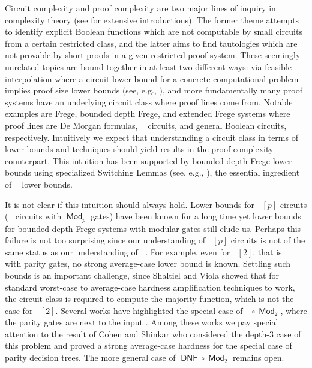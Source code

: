 \documentclass[a4paper,11pt,draft]{article}
\theoremstyle{definition}
\theoremstyle{remark}
\DeclareMathOperator{\ACzero}{\mathsf{AC}^0}
\DeclareMathOperator{\dnf}{\mathsf{DNF}}
\DeclareMathOperator{\Mod}{\mathsf{Mod}}
\DeclareMathOperator{\reslin}{\mathsf{Res}[\oplus]}
\begin{document}
Circuit complexity and proof complexity are two major lines of inquiry in complexity theory (see \cite{DBLP:books/daglib/0028687, kraj_2019} for extensive introductions). The former theme attempts to identify explicit Boolean functions which are not computable by small circuits from a certain restricted class, and the latter aims to find tautologies which are not provable by short proofs in a given restricted proof system. These seemingly unrelated topics are bound together in at least two different ways: via feasible interpolation where a circuit lower bound for a concrete computational problem implies proof size lower bounds (see, e.g., \cite{DBLP:conf/focs/HrubesP17}), and more fundamentally many proof systems have an underlying circuit class where proof lines come from. Notable examples are Frege, bounded depth Frege, and extended Frege systems where proof lines are De Morgan formulas, $\ACzero$ circuits, and general Boolean circuits, respectively. Intuitively we expect that understanding a circuit class in terms of lower bounds and techniques should yield results in the proof complexity counterpart. This intuition has been supported by bounded depth Frege lower bounds using specialized Switching Lemmas (see, e.g., \cite{DBLP:journals/jacm/Hastad21}), the essential ingredient of $\ACzero$ lower bounds.

\bigskip
\noindent{\bf $\ACzero[2]$ circuits and $\reslin$ proof system.} It is not clear if this intuition should always hold. Lower bounds for $\ACzero[p]$ circuits ($\ACzero$ circuits with $\Mod_p$ gates) have been known for a long time \cite{MR897705,DBLP:conf/stoc/Smolensky87} yet lower bounds for bounded depth Frege systems with modular gates still elude us. Perhaps this failure is not too surprising since our understanding of $\ACzero[p]$ circuits is not of the same status as our understanding of $\ACzero$. For example, even for $\ACzero[2]$, that is $\ACzero$ with parity gates, no strong average-case lower bound is known. Settling such bounds is an important challenge, since Shaltiel and Viola \cite{DBLP:journals/siamcomp/ShaltielV10} showed that for standard worst-case to average-case hardness amplification techniques to work, the circuit class is required to compute the majority function, which is not the case for $\ACzero[2]$. Several works have highlighted the special case of $\ACzero\circ \Mod_2$, where the parity gates are next to the input \cite{DBLP:journals/eccc/ServedioV12,DBLP:conf/innovations/AkaviaBGKR14,DBLP:conf/innovations/CohenS16}. Among these works we pay special attention to the result of Cohen and Shinkar \cite{DBLP:conf/innovations/CohenS16} who considered the depth-3 case of this problem and proved a strong average-case hardness for the special case of parity decision trees. The more general case of $\dnf \circ \Mod_2$ remains open.
\end{document}
